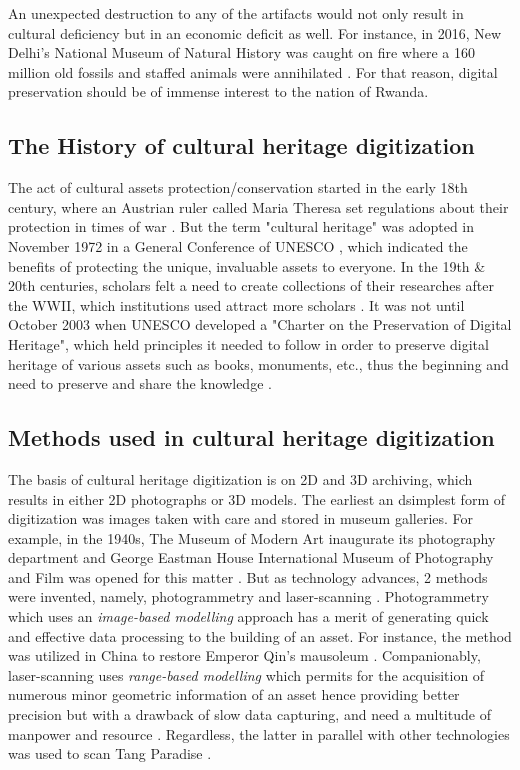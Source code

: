 \documentclass[conference]{IEEEtran}
\begin{document}
An unexpected destruction to any of the artifacts would not only result in cultural deficiency but in an economic deficit as well. For instance, in 2016, New Delhi’s
National Museum of Natural History was caught on fire where a 160 million old fossils and staffed animals were annihilated \cite{delhi012}. For that reason, digital preservation should
be of immense interest to the nation of Rwanda. \\

\subsection{\textbf{The History of cultural heritage digitization}}
The act of cultural assets protection/conservation started in the early 18th century, where an Austrian ruler called Maria Theresa set regulations about their protection in times of war \cite{germ72}.
But the term "cultural heritage" was adopted in November 1972 in a General Conference of UNESCO \cite{batisse01}, which indicated the benefits of protecting the unique, invaluable assets to everyone.
In the 19th \& 20th centuries, scholars felt a need to create collections of their researches after the WWII, which institutions used attract more scholars \cite{Note2011}. It was not until October 2003 when UNESCO developed a
"Charter on the Preservation of Digital Heritage", which held principles it needed to follow in order to preserve digital heritage of various assets such as
books, monuments, etc., thus the beginning and need to preserve and share the knowledge \cite{charter002}. \\

\subsection{\textbf{Methods used in cultural heritage digitization}}
The basis of cultural heritage digitization is on 2D and 3D archiving, which results in either 2D photographs or 3D models. The earliest an dsimplest form of digitization was images taken with care and stored in
museum galleries. For example, in the 1940s, The Museum of Modern Art inaugurate its photography department and George Eastman House International Museum of Photography and Film was
opened for this matter \cite{Note2011}. But as technology advances, 2 methods were invented, namely, photogrammetry and laser-scanning \cite{dgpht}. Photogrammetry which uses an \textit{image-based modelling} approach has a merit of
generating quick and effective data processing to the building of an asset. For instance, the method was utilized in China to restore  Emperor Qin’s mausoleum \cite{Zhou2012}. Companionably, laser-scanning uses \textit{range-based modelling}
which permits for the acquisition of numerous minor geometric information of an asset hence providing better precision \cite{dgpht} but with a drawback of slow data capturing, and need a multitude of manpower and resource \cite{Zhou2012}.
Regardless, the latter in parallel with other technologies was used to scan Tang Paradise \cite{dgpht}.
\end{document}
